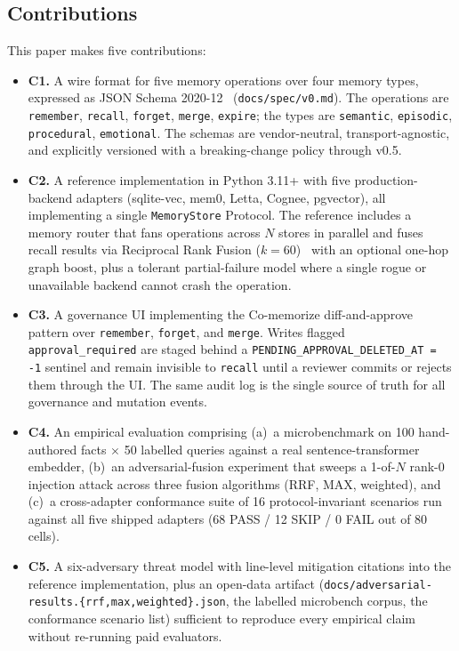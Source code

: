 \documentclass[11pt,letterpaper,twocolumn]{article}
\begin{document}
\subsection{Contributions}
\label{sec:intro-contributions}

This paper makes five contributions:

\begin{itemize}[leftmargin=*]
  \item \textbf{C1.} A wire format for five memory operations over four memory types, expressed as JSON Schema 2020-12~\cite{jsonschema_2020_12} (\texttt{docs/spec/v0.md}). The operations are \texttt{remember}, \texttt{recall}, \texttt{forget}, \texttt{merge}, \texttt{expire}; the types are \texttt{semantic}, \texttt{episodic}, \texttt{procedural}, \texttt{emotional}. The schemas are vendor-neutral, transport-agnostic, and explicitly versioned with a breaking-change policy through v0.5.
  \item \textbf{C2.} A reference implementation in Python 3.11+ with five production-backend adapters (sqlite-vec, mem0, Letta, Cognee, pgvector), all implementing a single \texttt{MemoryStore} Protocol. The reference includes a memory router that fans operations across $N$ stores in parallel and fuses recall results via Reciprocal Rank Fusion ($k=60$)~\cite{cormack2009rrf} with an optional one-hop graph boost, plus a tolerant partial-failure model where a single rogue or unavailable backend cannot crash the operation.
  \item \textbf{C3.} A governance UI implementing the Co-memorize diff-and-approve pattern over \texttt{remember}, \texttt{forget}, and \texttt{merge}. Writes flagged \texttt{approval\_required} are staged behind a \texttt{PENDING\_APPROVAL\_DELETED\_AT = -1} sentinel and remain invisible to \texttt{recall} until a reviewer commits or rejects them through the UI. The same audit log is the single source of truth for all governance and mutation events.
  \item \textbf{C4.} An empirical evaluation comprising (a)~a microbenchmark on 100 hand-authored facts $\times$ 50 labelled queries against a real sentence-transformer embedder, (b)~an adversarial-fusion experiment that sweeps a 1-of-$N$ rank-0 injection attack across three fusion algorithms (RRF, MAX, weighted), and (c)~a cross-adapter conformance suite of 16 protocol-invariant scenarios run against all five shipped adapters (68 PASS / 12 SKIP / 0 FAIL out of 80 cells).
  \item \textbf{C5.} A six-adversary threat model with line-level mitigation citations into the reference implementation, plus an open-data artifact (\texttt{docs/adversarial-results.\{rrf,max,weighted\}.json}, the labelled microbench corpus, the conformance scenario list) sufficient to reproduce every empirical claim without re-running paid evaluators.
\end{itemize}
\end{document}
